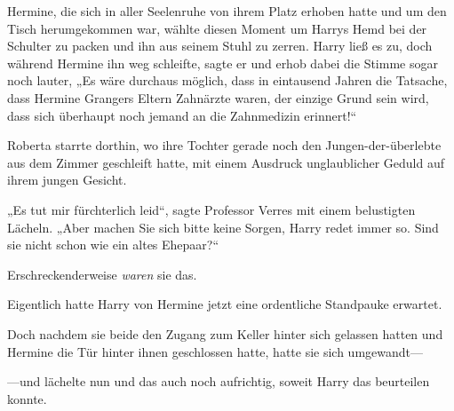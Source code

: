 Hermine, die sich in aller Seelenruhe von ihrem Platz erhoben hatte und um den Tisch herumgekommen war, wählte diesen Moment um Harrys Hemd bei der Schulter zu packen und ihn aus seinem Stuhl zu zerren. Harry ließ es zu, doch während Hermine ihn weg schleifte, sagte er und erhob dabei die Stimme sogar noch lauter, „Es wäre durchaus möglich, dass in eintausend Jahren die Tatsache, dass Hermine Grangers Eltern Zahnärzte waren, der einzige Grund sein wird, dass sich überhaupt noch jemand an die Zahnmedizin erinnert!“

\later

Roberta starrte dorthin, wo ihre Tochter gerade noch den Jungen-der-überlebte aus dem Zimmer geschleift hatte, mit einem Ausdruck unglaublicher Geduld auf ihrem jungen Gesicht.

„Es tut mir fürchterlich leid“, sagte Professor Verres mit einem belustigten Lächeln. „Aber machen Sie sich bitte keine Sorgen, Harry redet immer so. Sind sie nicht schon wie ein altes Ehepaar?“

Erschreckenderweise \emph{waren} sie das.

\later

Eigentlich hatte Harry von Hermine jetzt eine ordentliche Standpauke erwartet.

Doch nachdem sie beide den Zugang zum Keller hinter sich gelassen hatten und Hermine die Tür hinter ihnen geschlossen hatte, hatte sie sich umgewandt—

—und lächelte nun und das auch noch aufrichtig, soweit Harry das beurteilen konnte.

